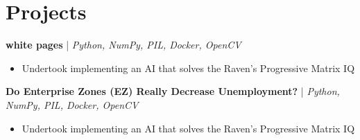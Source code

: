\documentclass[12pt, letterpaper]{article}
\begin{document}
\section{Projects}
\textbf{white pages} | \small\textit{Python, NumPy, PIL, Docker, OpenCV}
\begin{itemize}[noitemsep,topsep=0pt]
  \item Undertook implementing an AI that solves the Raven's Progressive Matrix IQ
\end{itemize}
\textbf{Do Enterprise Zones (EZ) Really Decrease Unemployment?} | \small\textit{Python, NumPy, PIL, Docker, OpenCV}
\begin{itemize}[noitemsep,topsep=0pt]
  \item Undertook implementing an AI that solves the Raven's Progressive Matrix IQ
\end{itemize}
\end{document}
